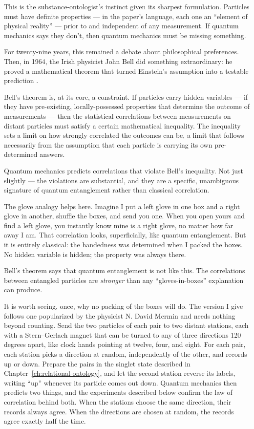 This is the substance-ontologist's instinct given its sharpest formulation. Particles must have definite properties --- in the paper's language, each one an ``element of physical reality'' --- prior to and independent of any measurement. If quantum mechanics says they don't, then quantum mechanics must be missing something.

For twenty-nine years, this remained a debate about philosophical preferences. Then, in 1964, the Irish physicist John Bell did something extraordinary: he proved a mathematical theorem that turned Einstein's assumption into a testable prediction \citep{Bell1964}.

Bell's theorem is, at its core, a constraint. If particles carry hidden variables --- if they have pre-existing, locally-possessed properties that determine the outcome of measurements --- then the statistical correlations between measurements on distant particles must satisfy a certain mathematical inequality. The inequality sets a limit on how strongly correlated the outcomes can be, a limit that follows necessarily from the assumption that each particle is carrying its own pre-determined answers.

Quantum mechanics predicts correlations that violate Bell's inequality. Not just slightly --- the violations are substantial, and they are a specific, unambiguous signature of quantum entanglement rather than classical correlation.

The glove analogy helps here. Imagine I put a left glove in one box and a right glove in another, shuffle the boxes, and send you one. When you open yours and find a left glove, you instantly know mine is a right glove, no matter how far away I am. That correlation looks, superficially, like quantum entanglement. But it is entirely classical: the handedness was determined when I packed the boxes. No hidden variable is hidden; the property was always there.

Bell's theorem says that quantum entanglement is not like this. The correlations between entangled particles are \emph{stronger} than any ``gloves-in-boxes'' explanation can produce.

It is worth seeing, once, why no packing of the boxes will do. The version I give follows one popularized by the physicist N. David Mermin and needs nothing beyond counting. Send the two particles of each pair to two distant stations, each with a Stern--Gerlach magnet that can be turned to any of three directions 120 degrees apart, like clock hands pointing at twelve, four, and eight. For each pair, each station picks a direction at random, independently of the other, and records up or down. Prepare the pairs in the singlet state described in Chapter~\ref{ch:relational-ontology}, and let the second station reverse its labels, writing ``up'' whenever its particle comes out down. Quantum mechanics then predicts two things, and the experiments described below confirm the law of correlation behind both. When the stations choose the same direction, their records always agree. When the directions are chosen at random, the records agree exactly half the time.

